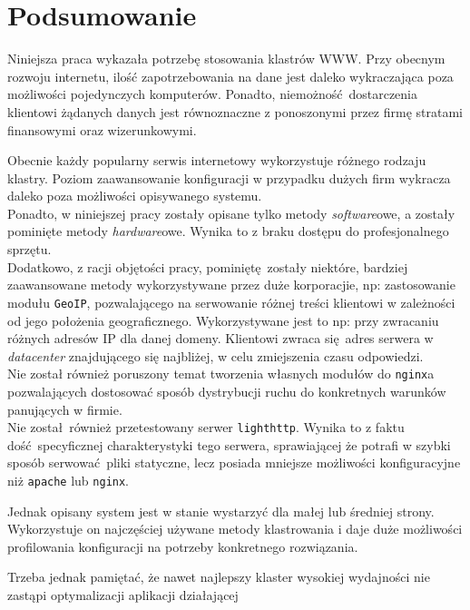 \chapter*{Podsumowanie}
Niniejsza praca wykazała potrzebę stosowania klastrów WWW.
Przy obecnym rozwoju internetu, ilość zapotrzebowania na dane jest daleko wykraczająca poza możliwości pojedynczych komputerów.
Ponadto, niemożność dostarczenia klientowi żądanych danych jest równoznaczne z ponoszonymi przez firmę stratami finansowymi oraz wizerunkowymi.

Obecnie każdy popularny serwis internetowy wykorzystuje różnego rodzaju klastry.
Poziom zaawansowanie konfiguracji w przypadku dużych firm wykracza daleko poza możliwości opisywanego systemu.\\

Ponadto, w niniejszej pracy zostały opisane tylko metody \textit{software}owe, a zostały pominięte metody \textit{hardware}owe.
Wynika to z braku dostępu do profesjonalnego sprzętu.\\
Dodatkowo, z racji objętości pracy, pominiętę zostały niektóre, bardziej zaawansowane metody wykorzystywane przez duże korporacjie, np: zastosowanie modułu \texttt{GeoIP}, pozwalającego na serwowanie różnej treści klientowi w zależności od jego położenia geograficznego.
Wykorzystywane jest to np: przy zwracaniu różnych adresów IP dla danej domeny.
Klientowi zwraca się adres serwera w \textit{datacenter} znajdującego się najbliżej, w celu zmiejszenia czasu odpowiedzi.\\
Nie został również poruszony temat tworzenia własnych modułów do \texttt{nginx}a pozwalających dostosować sposób dystrybucji ruchu do konkretnych warunków panujących w firmie.\\
Nie został również przetestowany serwer \texttt{lighthttp}.
Wynika to z faktu dość specyficznej charakterystyki tego serwera, sprawiającej że potrafi w szybki sposób serwować pliki statyczne, lecz posiada mniejsze możliwości konfiguracyjne niż \texttt{apache} lub \texttt{nginx}.

Jednak opisany system jest w stanie wystarzyć dla małej lub średniej strony.
Wykorzystuje on najczęściej używane metody klastrowania i daje duże możliwości profilowania konfiguracji na potrzeby konkretnego rozwiązania.

Trzeba jednak pamiętać, że nawet najlepszy klaster wysokiej wydajności nie zastąpi optymalizacji aplikacji działającej 
